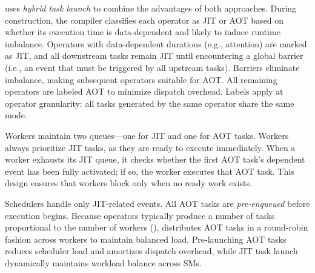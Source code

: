 \Sys uses {\em hybrid task launch} to combine the advantages of both approaches. During \graph construction, the compiler classifies each operator as JIT or AOT based on whether its execution time is data-dependent and likely to induce runtime imbalance. Operators with data-dependent durations (e.g., attention) are marked as JIT, and all downstream tasks remain JIT until encountering a global barrier (i.e., an event that must be triggered by all upstream tasks). Barriers eliminate imbalance, making subsequent operators suitable for AOT. All remaining operators are labeled AOT to minimize dispatch overhead. Labels apply at operator granularity: all tasks generated by the same operator share the same mode.

Workers maintain two queues—one for JIT and one for AOT tasks. Workers always prioritize JIT tasks, as they are ready to execute immediately. When a worker exhausts its JIT queue, it checks whether the first AOT task’s dependent event has been fully activated; if so, the worker executes that AOT task. This design ensures that workers block only when no ready work exists.

Schedulers handle only JIT-related events. All AOT tasks are {\em pre-enqueued} before execution begins. Because operators typically produce a number of tasks proportional to the number of workers (), \sys distributes AOT tasks in a round-robin fashion across workers to maintain balanced load. Pre-launching AOT tasks reduces scheduler load and amortizes dispatch overhead, while JIT task launch dynamically maintains workload balance across SMs.

